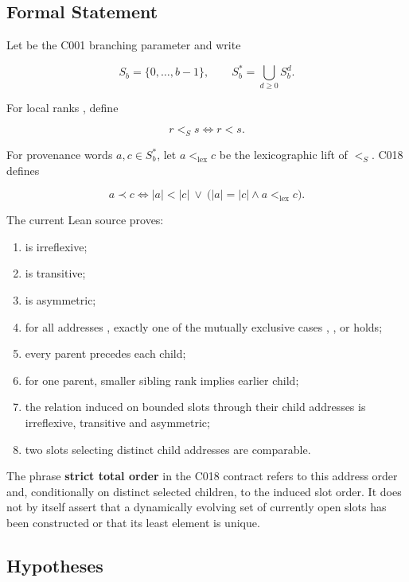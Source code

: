\subsection{Formal Statement}\label{formal-statement}

Let \texttt{\protect{}} be the C001 branching parameter and write

\[
S_b=\{0,\ldots,b-1\},\qquad S_b^*=\bigcup_{d\ge 0}S_b^d.
\]

For local ranks \texttt{\protect{}}, define

\[
r <_S s \iff r<s.
\]

For provenance words \(a,c\in S_b^*\), let \(a<_{\mathrm{lex}}c\) be the
lexicographic lift of \(<_S\). C018 defines

\[
a\prec c
\iff
|a|<|c|\ \lor\ \bigl(|a|=|c|\land a<_\mathrm{lex}c\bigr).
\]

The current Lean source proves:

\begin{enumerate}
\def\labelenumi{\arabic{enumi}.}
\tightlist
\item
  \texttt{\protect{}} is irreflexive;
\item
  \texttt{\protect{}} is transitive;
\item
  \texttt{\protect{}} is asymmetric;
\item
  for all addresses \texttt{\protect{}}, exactly one of the mutually exclusive
  cases \texttt{\protect{}}, \texttt{\protect{}}, or \texttt{\protect{}} holds;
\item
  every parent precedes each child;
\item
  for one parent, smaller sibling rank implies earlier child;
\item
  the relation induced on bounded slots through their child addresses is
  irreflexive, transitive and asymmetric;
\item
  two slots selecting distinct child addresses are comparable.
\end{enumerate}

The phrase \textbf{strict total order} in the C018 contract refers to
this address order and, conditionally on distinct selected children, to
the induced slot order. It does not by itself assert that a dynamically
evolving set of currently open slots has been constructed or that its
least element is unique.

\subsection{Hypotheses}\label{hypotheses}

